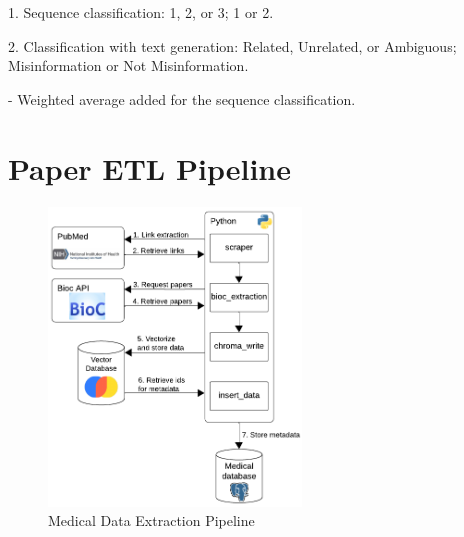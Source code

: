     1. Sequence classification: 1, 2, or 3; 1 or 2.

    2. Classification with text generation: Related, Unrelated, or Ambiguous; Misinformation or Not Misinformation.

- Weighted average added for the sequence classification.


\section{Paper ETL Pipeline}

\begin{figure}[H]
	\begin{center}
		\includegraphics[width=0.6\textwidth]{images/ETL_Pipeline} %
	\end{center}
	\caption{Medical Data Extraction Pipeline} %
	\label{fig:etl}
\end{figure}

